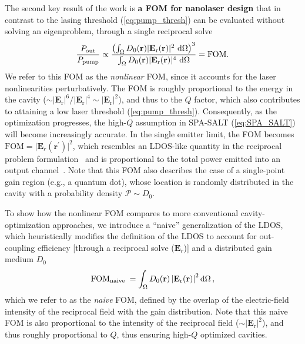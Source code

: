 The second key result of the work is \textbf{a FOM for nanolaser design} that in contrast to the lasing threshold (\eqref{eq:pump_thresh}) can be evaluated without solving an eigenproblem, through a single reciprocal solve~\cite{ownpub4}
\begin{equation}\label{eq:eff_nl}
    \frac{P_\text{out}}{P_\text{pump}} \propto \frac{\left( \int_{\Omega} D_0(\mathbf{r})|\mathbf{E}_{\text{r}}(\mathbf{r})|^2 \,  \mathop{}\!\text{d} \Omega \right)^3} {\int_{\Omega} D_0(\mathbf{r}) |\mathbf{E}_{\text{r}}(\mathbf{r})|^4 \,  \mathop{}\!\text{d} \Omega} = \text{FOM}.
\end{equation}
We refer to this FOM as the \emph{nonlinear} FOM, since it accounts for the laser nonlinearities perturbatively. The FOM is roughly proportional 
to the energy in the cavity ($\sim |\mathbf{E}_{\text{r}}|^6 / |\mathbf{E}_{\text{r}}|^4 \sim |\mathbf{E}_{\text{r}}|^2$), and thus to the $Q$ factor, which also contributes to attaining a low
laser threshold (\eqref{eq:pump_thresh}). Consequently, as the optimization progresses, the high-$Q$ assumption in SPA-SALT (\eqref{eq:SPA_SALT}) will become increasingly accurate. In the single emitter limit, the FOM becomes
$\text{FOM}=\vert \mathbf{E}_{r}(\mathbf{r}^\prime) \vert^2$, which resembles an LDOS-like quantity in the reciprocal problem formulation~\cite{reci} and is proportional to the total power emitted into an output channel~\cite[App.~C]{reci}. 
 Note that this FOM also describes the case of a single-point gain region (e.g., a quantum dot),
whose location is randomly distributed in the cavity with a probability density $\mathcal{P} \sim D_0$. 

To show how the nonlinear FOM compares to more conventional cavity-optimization approaches, we introduce a “naive” generalization of the LDOS, which heuristically modifies the definition
of the LDOS to account for out-coupling efficiency [through a reciprocal solve ($\mathbf{E}_r$)] and a distributed gain
medium $D_0$
\begin{equation}\label{eq:SEL}
 \text{FOM}_{\text {naive }}=\int_{\Omega} D_0(\mathbf{r})\left|\mathbf{E}_{\text{r}}(\mathbf{r})\right|^2 \mathop{}\!\text{d} \Omega\,,
\end{equation}
which we refer to as the \emph{naive} FOM, defined by the overlap of the electric-field intensity of the reciprocal field with the gain distribution.
Note that this naive FOM is also proportional to the intensity of the reciprocal field ($\sim |\mathbf{E}_{\text{r}}|^2$), and thus roughly proportional to $Q$, thus ensuring 
high-$Q$ optimized cavities.


